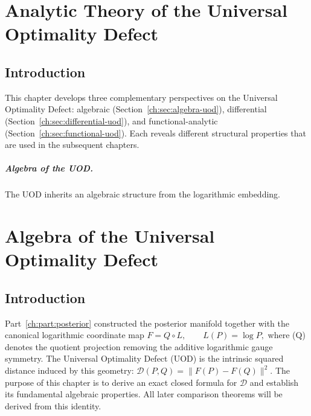 \chapter[Analytic Theory]{Analytic Theory of the Universal Optimality Defect}\label{ch:sec:analytic-uod}

\section{Introduction}\label{ch:sec:introduction-analytic_uod}

This chapter develops three complementary perspectives on the Universal
Optimality Defect: algebraic (Section~\ref{ch:sec:algebra-uod}), differential (Section~\ref{ch:sec:differential-uod}), and
functional-analytic (Section~\ref{ch:sec:functional-uod}).  Each reveals different structural
properties that are used in the subsequent chapters.

\paragraph{Algebra of the UOD.}
The UOD inherits an algebraic structure from the logarithmic embedding.
\label{ch:sec:algebra-uod}


\chapter[Algebra of the UOD]{Algebra of the Universal Optimality Defect}\label{ch:sec:algebra-of-the-universal-optimality-defect}
\section{Introduction}\label{ch:sec:introduction-analytic_uod-2}
Part~\ref{ch:part:posterior} constructed the posterior manifold together with the
canonical logarithmic coordinate map
$F = Q\circ L, \qquad L(P)=\log P,$
where (Q) denotes the quotient projection removing the additive
logarithmic gauge symmetry. The Universal Optimality Defect (UOD) is the
intrinsic squared distance induced by this geometry:
$\mathcal{D}(P,Q)=\|F(P)-F(Q)\|^{2}.$
The purpose of this chapter is to derive an exact closed formula for
\(\mathcal{D}\) and establish its fundamental algebraic properties.
All later comparison theorems will be derived from this identity.
